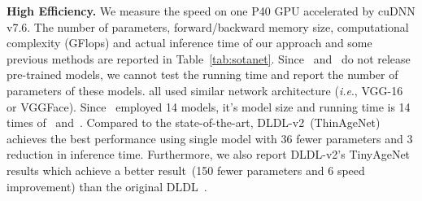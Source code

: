 \documentclass[5p,times,twocolumn]{elsarticle}
\makeatletter
\DeclareRobustCommand\onedot{\@onedot}
\def\@onedot{.}
\def\ie{\emph{i.e}\onedot}
\makeatother
\begin{document}
\textbf{High Efficiency.} We measure the speed on one {P40 GPU accelerated by cuDNN v7.6}. 
The number of parameters, {forward/backward memory size, computational complexity (GFlops) and actual inference time}
of our approach and some previous methods are reported in Table~\ref{tab:sotanet}. Since~\cite{niu2016ordinal} and~\cite{chen2017using} do not release pre-trained models, we cannot test the running time and report the number of parameters of these models. \cite{gao2017deep,rothe2016deep,antipov2017effective,shen2017label,shen2017deep,pan2018mean,tan2018efficient,li2019bridgenet,liu2020similarity,li2021learning,liu2017ordinal,tan2018efficient,li2019bridgenet,liu2020similarity,li2021learning,liu2017ordinal} all used similar network architecture (\ie, VGG-16 or VGGFace). Since~\cite{antipov2016apparent} employed 14 models, it's model size and running time is 14 times of~\cite{rothe2016deep} and~\cite{gao2017deep}. Compared to the state-of-the-art, DLDL-v2~(ThinAgeNet) achieves the best performance using single model with 36 fewer parameters and 3 reduction in inference time. Furthermore, we also report DLDL-v2's TinyAgeNet results which achieve a better result~(150 fewer parameters and 6 speed improvement) than the original DLDL~\cite{gao2017deep}. 
\end{document}
